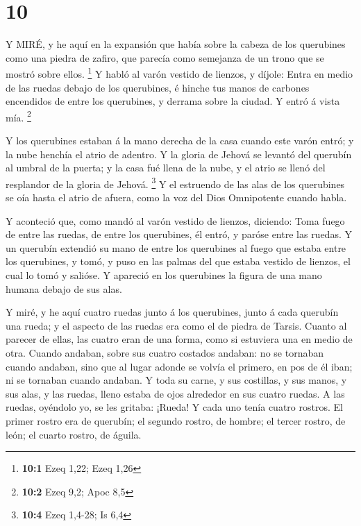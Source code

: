 \hypertarget{section-9}{%
\section{10}\label{section-9}}

 Y MIRÉ, y he aquí en la expansión que había sobre la cabeza
de los querubines como una piedra de zafiro, que parecía como semejanza
de un trono que se mostró sobre ellos. \footnote{\textbf{10:1} Ezeq
  1,22; Ezeq 1,26}  Y habló al varón vestido de lienzos, y
díjole: Entra en medio de las ruedas debajo de los querubines, é hinche
tus manos de carbones encendidos de entre los querubines, y derrama
sobre la ciudad. Y entró á vista mía. \footnote{\textbf{10:2} Ezeq 9,2;
  Apoc 8,5}

 Y los querubines estaban á la mano derecha de la casa
cuando este varón entró; y la nube henchía el atrio de adentro.
 Y la gloria de Jehová se levantó del querubín al umbral de
la puerta; y la casa fué llena de la nube, y el atrio se llenó del
resplandor de la gloria de Jehová. \footnote{\textbf{10:4} Ezeq 1,4-28;
  Is 6,4}  Y el estruendo de las alas de los querubines se
oía hasta el atrio de afuera, como la voz del Dios Omnipotente cuando
habla.

 Y aconteció que, como mandó al varón vestido de lienzos,
diciendo: Toma fuego de entre las ruedas, de entre los querubines, él
entró, y paróse entre las ruedas.  Y un querubín extendió su
mano de entre los querubines al fuego que estaba entre los querubines, y
tomó, y puso en las palmas del que estaba vestido de lienzos, el cual lo
tomó y salióse.  Y apareció en los querubines la figura de
una mano humana debajo de sus alas.

 Y miré, y he aquí cuatro ruedas junto á los querubines,
junto á cada querubín una rueda; y el aspecto de las ruedas era como el
de piedra de Tarsis.  Cuanto al parecer de ellas, las
cuatro eran de una forma, como si estuviera una en medio de otra.
 Cuando andaban, sobre sus cuatro costados andaban: no se
tornaban cuando andaban, sino que al lugar adonde se volvía el primero,
en pos de él iban; ni se tornaban cuando andaban.  Y toda
su carne, y sus costillas, y sus manos, y sus alas, y las ruedas, lleno
estaba de ojos alrededor en sus cuatro ruedas.  A las
ruedas, oyéndolo yo, se les gritaba: ¡Rueda!  Y cada uno
tenía cuatro rostros. El primer rostro era de querubín; el segundo
rostro, de hombre; el tercer rostro, de león; el cuarto rostro, de
águila.

